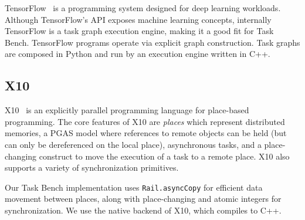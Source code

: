 TensorFlow~\cite{TensorFlow15} is a programming system designed for
deep learning workloads. Although TensorFlow's API exposes
machine learning concepts, internally TensorFlow is a task graph execution engine, making it a good fit for
Task Bench. TensorFlow programs operate via explicit graph construction. Task graphs are composed in Python and run by an
execution engine written in C++.

\subsection{X10}

X10~\cite{X1005} is an explicitly parallel programming language for
place-based programming. The core features of X10 are \emph{places}
which represent distributed memories, a PGAS model where references to
remote objects can be held (but can only be dereferenced on the local
place), asynchronous tasks, and a place-changing construct to move the
execution of a task to a remote place. X10 also supports a variety of
synchronization primitives.

Our Task Bench implementation uses
\lstinline[language=X10]{Rail.asyncCopy} for efficient data movement
between places, along with place-changing and atomic integers for
synchronization. We use the native backend of X10, which compiles to
C++.
